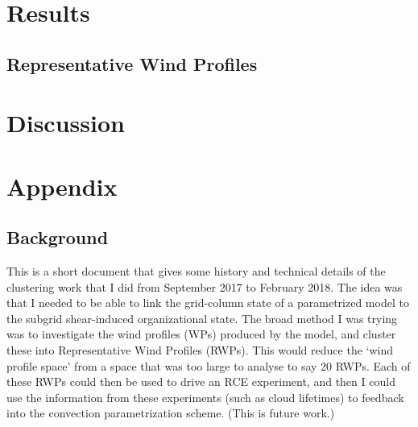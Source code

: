 \documentclass{article}
\begin{document}
\section{Results}

\subsection{Representative Wind Profiles}

\section{Discussion}

\newpage
\section*{Appendix}

\subsection*{Background}

This is a short document that gives some history and technical details of the clustering work that I did from September 2017 to February 2018. The idea was that I needed to be able to link the grid-column state of a parametrized model to the subgrid shear-induced organizational state. The broad method I was trying was to investigate the wind profiles (WPs) produced by the model, and cluster these into Representative Wind Profiles (RWPs). This would reduce the `wind profile space' from a space that was too large to analyse to say 20 RWPs. Each of these RWPs could then be used to drive an RCE experiment, and then I could use the information from these experiments (such as cloud lifetimes) to feedback into the convection parametrization scheme. (This is future work.)
\end{document}
